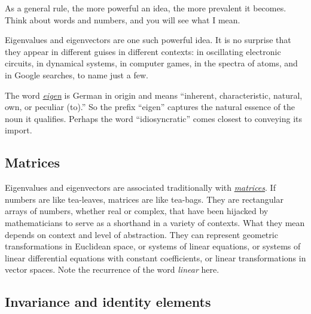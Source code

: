 \documentclass[
  11pt,
  a4paper,
]{article}
\begin{document}
As a general rule, the more powerful an idea, the more prevalent it
becomes. Think about words and numbers, and you will see what I mean.

Eigenvalues and eigenvectors are one such powerful idea. It is no
surprise that they appear in different guises in different contexts: in
oscillating electronic circuits, in dynamical systems, in computer
games, in the spectra of atoms, and in Google searches, to name just a
few.

The word
\href{https://en.wikipedia.org/wiki/Talk:Eigenvector}{\emph{eigen}} is
German in origin and means ``inherent, characteristic, natural, own, or
peculiar (to).'' So the prefix ``eigen'' captures the natural essence of
the noun it qualifies. Perhaps the word ``idiosyncratic'' comes closest
to conveying its import.

\hypertarget{matrices}{%
\subsection{Matrices}\label{matrices}}

Eigenvalues and eigenvectors are associated traditionally with
\href{https://en.wikipedia.org/wiki/Matrix_\%28mathematics\%29}{\emph{matrices}}.
If numbers are like tea-leaves, matrices are like tea-bags. They are
rectangular arrays of numbers, whether real or complex, that have been
hijacked by mathematicians to serve as a shorthand in a variety of
contexts. What they mean depends on context and level of abstraction.
They can represent geometric transformations in Euclidean space, or
systems of linear equations, or systems of linear differential equations
with constant coefficients, or linear transformations in vector spaces.
Note the recurrence of the word \emph{linear} here.

\hypertarget{invariance-and-identity-elements}{%
\subsection{Invariance and identity
elements}\label{invariance-and-identity-elements}}
\end{document}
